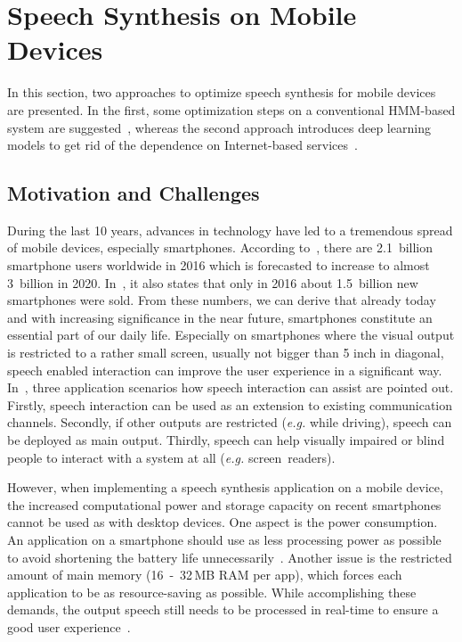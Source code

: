 \section{Speech Synthesis on Mobile Devices}
\label{sec:embeddedspeech}

In this section, two approaches to optimize speech synthesis for mobile devices are presented. In the first, some optimization steps on a conventional \ac{HMM}-based system are suggested~\cite{toth:optimizing}, whereas the second approach introduces deep learning models to get rid of the dependence on Internet-based services~\cite{boros:robust}.

\subsection{Motivation and Challenges}
\label{subsec:motembedded}

During the last 10 years, advances in technology have led to a tremendous spread of mobile devices, especially smartphones. According to~\cite{statista:smartphones}, there are 2.1~billion smartphone users worldwide in 2016 which is forecasted to increase to almost 3~billion in 2020. In~\cite{statista:smartphones}, it also states that only in 2016 about 1.5~billion new smartphones were sold. From these numbers, we can derive that already today and with increasing significance in the near future, smartphones constitute an essential part of our daily life. Especially on smartphones where the visual output is restricted to a rather small screen, usually not bigger than 5 inch in diagonal, speech enabled interaction can improve the user experience in a significant way. In~\cite{toth:optimizing}, three application scenarios how speech interaction can assist are pointed out. Firstly, speech interaction can be used as an extension to existing communication channels. Secondly, if other outputs are restricted (\textit{e.g.} while driving), speech can be deployed as main output. Thirdly, speech can help visually impaired or blind people to interact with a system at all (\textit{e.g.} screen~readers).

However, when implementing a speech synthesis application on a mobile device, the increased computational power and storage capacity on recent smartphones cannot be used as with desktop devices. One aspect is the power consumption. An application on a smartphone should use as less processing power as possible to avoid shortening the battery life unnecessarily~\cite{toth:optimizing}. Another issue is the restricted amount of main memory (16~-~32\,MB RAM per app), which forces each application to be as resource-saving as possible. While accomplishing these demands, the output speech still needs to be processed in real-time to ensure a good user experience~\cite{boros:robust}.

